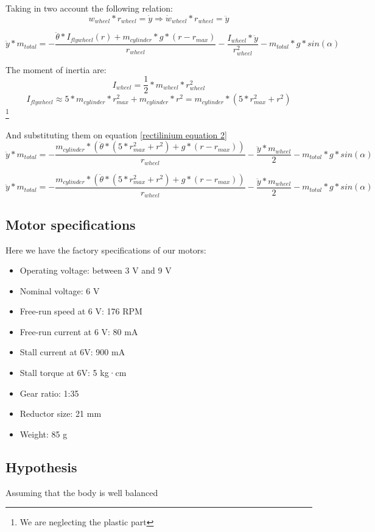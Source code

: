 Taking in two account the following relation:
\[w_{wheel} * r_{wheel} = \dot{y} \Rightarrow  \dot{w}_{wheel} * r_{wheel} = \ddot{y} \]


\begin{equation}\label{rectilinium equation 2}
    \ddot{y}*m_{total} = - \frac{\ddot{\theta}*I_{flywheel}(r) + m_{cylinder} * g * (r - r_{max})}{r_{wheel}} - \frac{I_{wheel} * \ddot{y}}{r_{wheel}^2} - m_{total} * g * sin(\alpha)  
\end{equation}

The moment of inertia are:
\[I_{wheel} = \frac{1}{2} *m_{wheel} * r_{wheel}^2\]
\[I_{flywheel} \approx 5 * m_{cylinder} * r_{max}^2 + m_{cylinder} * r^2 = m_{cylinder} * (5*r_{max}^2 + r^2)\] \footnote{We are neglecting the plastic part}


And substituting them on equation \ref{rectilinium equation 2}
\begin{equation}\label{rectilinium equation 3}
    \ddot{y}*m_{total} = - \frac{m_{cylinder}*(\ddot{\theta}*(5*r_{max}^2 + r^2) + g*(r - r_{max}))}{r_{wheel}} - \frac{\ddot{y}*m_{wheel}}{2} - m_{total}*g*sin(\alpha)  
\end{equation}

\begin{equation}\label{rectilinium equation 4}
    \ddot{y}*m_{total} = - \frac{m_{cylinder}*(\ddot{\theta}*(5*r_{max}^2 + r^2) + g*(r - r_{max}))}{r_{wheel}} - \frac{\ddot{y}*m_{wheel}}{2} - m_{total}*g*sin(\alpha)  
\end{equation}

\subsection{Motor specifications}

Here we have the factory specifications of our motors: 
\begin{itemize}
    \item Operating voltage: between 3 V and 9 V
    \item Nominal voltage: 6 V
    \item Free-run speed at 6 V: 176 RPM
    \item Free-run current at 6 V: 80 mA
    \item Stall current at 6V: 900 mA
    \item Stall torque at 6V: 5 kg·cm
    \item Gear ratio: 1:35
    \item Reductor size: 21 mm
    \item Weight: 85 g
\end{itemize}

\subsection{Hypothesis}
Assuming that the body is well balanced
